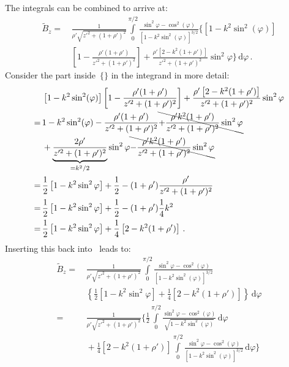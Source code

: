 The integrals can be combined to arrive at:
\begin{align}
 \tilde{B}_z
 =&\, \frac{1}{\rho' \sqrt{z'^2 + (1 + \rho')^2}}
      \int\limits_0^{\pi/2}
        \frac{\sin^2{\varphi} - \cos^2(\varphi)}{\left[1 - k^2 \sin^2(\varphi)\right]^{3/2}} \Biggl\{ \left[1 - k^2 \sin^2(\varphi)\right] \nonumber \\
 ~&\,        \left[1 - \frac{\rho'(1 + \rho')}{z'^2 + (1 + \rho')^2} \right]
          + \frac{\rho'\left[2 - k^2(1+\rho')\right]}{z'^2 + (1 + \rho')^2} \sin^2{\varphi} \Biggr\} \,\mathrm{d}\varphi \, . \label{eqn:cwl_B_z_halfway}
\end{align}
Consider the part inside~$\{\}$ in the integrand in more detail:
\begin{align}
 ~&\,   \left[1 - k^2 \sin^2(\varphi)\right] \left[1 - \frac{\rho'(1 + \rho')}{z'^2 + (1 + \rho')^2} \right]
      + \frac{\rho'\left[2 - k^2(1+\rho')\right]}{z'^2 + (1 + \rho')^2} \sin^2{\varphi} \nonumber \\
 =&\, 1 - k^2 \sin^2(\varphi) - \frac{\rho'(1 + \rho')}{z'^2 + (1 + \rho')^2}
        \bcancel{+\frac{\rho' k^2 (1 + \rho')}{z'^2 + (1 + \rho')^2} \sin^2{\varphi}} \nonumber \\
 ~&\,   + \underbrace{\frac{2 \rho'}{z'^2 + (1 + \rho')^2}}_{=k^2/2} \sin^2{\varphi}
        \bcancel{-\frac{\rho' k^2 (1+\rho')}{z'^2 + (1 + \rho')^2} \sin^2{\varphi}} \nonumber \\
 =&\, \frac{1}{2} \left[1 - k^2 \sin^2{\varphi} \right] + \frac{1}{2} - (1+\rho') \frac{\rho'}{z'^2 + (1 + \rho')^2} \nonumber \\
 =&\, \frac{1}{2} \left[1 - k^2 \sin^2{\varphi} \right] + \frac{1}{2} - (1+\rho') \frac{1}{4} k^2 \nonumber \\
 =&\, \frac{1}{2} \left[1 - k^2 \sin^2{\varphi} \right] + \frac{1}{4} \left[2 - k^2 (1+\rho') \right] \, .
\end{align}
Inserting this back into~ leads to:
\begin{align}
 \tilde{B}_z
 =&\, \frac{1}{\rho' \sqrt{z'^2 + (1 + \rho')^2}}
      \int\limits_0^{\pi/2}
        \frac{\sin^2{\varphi} - \cos^2(\varphi)}{\left[1 - k^2 \sin^2(\varphi)\right]^{3/2}} \nonumber \\
 ~&\, \left\{ \frac{1}{2} \left[1 - k^2 \sin^2{\varphi} \right] + \frac{1}{4} \left[2 - k^2 (1+\rho') \right] \right\} \,\mathrm{d}\varphi \nonumber \\
 =&\, \frac{1}{\rho' \sqrt{z'^2 + (1 + \rho')^2}} \Biggl\{
          \frac{1}{2} \int\limits_0^{\pi/2} \frac{\sin^2{\varphi} - \cos^2(\varphi)}{\sqrt{1 - k^2 \sin^2(\varphi)}} \,\mathrm{d}\varphi \nonumber \\
 ~&\, + \frac{1}{4} \left[2 - k^2 (1+\rho') \right] \int\limits_0^{\pi/2}
        \frac{\sin^2{\varphi} - \cos^2(\varphi)}{\left[1 - k^2 \sin^2(\varphi)\right]^{3/2}} \,\mathrm{d}\varphi \Biggr\}
\end{align}
